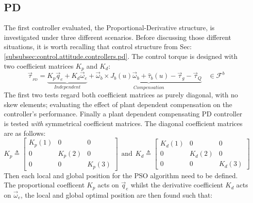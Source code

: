 \subsection{PD}
\label{subsec:simulation.attitude.pd}
The first controller evaluated, the Proportional-Derivative structure, is investigated under three different scenarios. Before discussing those different situations, it is worth recalling that control structure from Sec:\ref{subsubsec:control.attitude.controllers.pd}. The control torque is designed with two coefficient matrices $K_p$ and $K_d$:
\begin{equation}\label{eq:simulation-attitde-pd}
\vec{\tau}_{_{PD}}=\underbrace{K_p\vec{q}_e+K_d\vec{\omega}_e}_{Independent}+\underbrace{\vec{\omega}_b\times J_b(u)\vec{\omega}_b+\hat{\tau}_b(u)-\vec{\tau}_g-\vec{\tau}_Q}_{Compensation}~~~~\in\mathcal{F}^{b}
\end{equation}
The first two tests regard both coefficient matrices as purely diagonal, with no skew elements; evaluating the effect of plant dependent compensation on the controller's performance. Finally a plant dependent compensating PD controller is tested \emph{with} symmetrical coefficient matrices. The diagonal coefficient matrices are as follows:
\begin{equation}\label{eq:simulation-attitde-pd-diagonal-coefficients}
K_p\triangleq \begin{bmatrix}
K_p(1) & 0 & 0\\
0 & K_p(2) & 0\\
0 & 0 & K_p(3)
\end{bmatrix}
~~\text{and}~~K_d\triangleq \begin{bmatrix}
K_d(1) & 0 & 0\\
0 & K_d(2) & 0\\
0 & 0 & K_d(3)
\end{bmatrix}
\end{equation}
Then each local and global position for the PSO algorithm need to be defined. The proportional coefficent $K_p$ acts on $\vec{q}_e$ whilst the derivative coefficient $K_d$ acts on $\vec{\omega}_e$, the local and global optimal position are then found such that:
